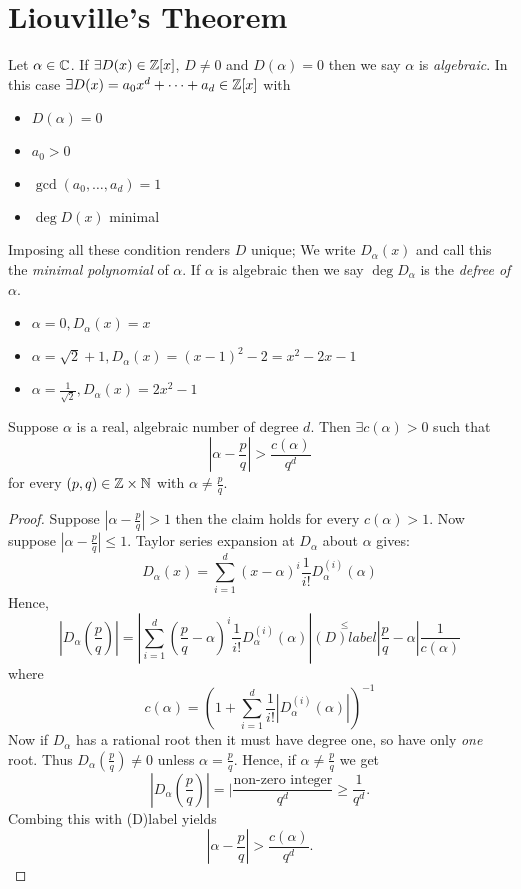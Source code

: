 \documentclass[NumTh.tex]{subfiles}
\begin{document}
\section{Liouville's Theorem}
Let $\alpha \in \mathbb{C}$. If $\exists D(x) \in \mathbb{Z}[x]$, $D \neq 0$ and $D(\alpha) = 0$ then we say $\alpha$ is \emph{algebraic}.
In this case $\exists D(x) = a_0 x^d + \dots + a_d \in \mathbb{Z}[x]$ with
\begin{itemize}
  \item $D(\alpha) = 0$
  \item $a_0 > 0$
  \item $\gcd(a_0,\dots,a_d) = 1$
  \item $\deg D(x)$ minimal
\end{itemize}
Imposing all these condition renders $D$ unique; We write $D_\alpha(x)$ and call this the \emph{minimal polynomial} of $\alpha$.
If $\alpha$ is algebraic then we say $\deg D_\alpha$ is the \emph{defree of $\alpha$}.

\begin{ex}
  \begin{itemize}
    \item $\alpha = 0, D_\alpha(x) = x$
    \item $\alpha = \sqrt{2} + 1, D_\alpha(x) = (x -1)^2 - 2 = x^2 -2x -1$
    \item $\alpha = \frac {1}{\sqrt{2}}, D_\alpha(x) = 2x^2 -1$
  \end{itemize}
\end{ex}

\begin{theorem}
  Suppose $\alpha$ is a real, algebraic number of degree $d$.
  Then $\exists c(\alpha) > 0$ such that
  \[ |\alpha - \frac{p}{q}| > \frac{c(\alpha)}{q^d} \]
  for every $(p,q) \in \mathbb{Z} \times \mathbb{N}$ with $\alpha \neq \frac{p}{q}$.
\end{theorem}

\begin{proof}
  Suppose $|\alpha - \frac{p}{q} | > 1$ then the claim holds for every $c(\alpha) > 1$.
  Now suppose $|\alpha - \frac{p}{q}| \leq 1$. Taylor series expansion at $D_\alpha$ about $\alpha$ gives:
  \[ D_\alpha(x) = \sum_{i=1}^d (x - \alpha)^i \frac{1}{i!} D_\alpha^{(i)}(\alpha) \]
  Hence, 
  \[ |D_\alpha\left(\frac{p}{q}\right) | = | \sum_{i=1}^d \left(\frac{p}{q} - \alpha \right)^i \frac{1}{i!} D_\alpha^{(i)}(\alpha)| \overset{\leq}{(D)label} |\frac{p}{q} - \alpha | \frac{1}{c(\alpha)} \]
  where
  \[ c(\alpha) = \left( 1 + \sum_{i=1}^d \frac{1}{i!} |D_\alpha^{(i)}(\alpha) |\right)^{-1} \]
  Now if $D_\alpha$ has a rational root then it must have degree one, so have only \emph{one} root.
  Thus $D_\alpha \left(\frac{p}{q}\right) \neq 0$ unless $\alpha = \frac{p}{q}$.
  Hence, if $\alpha \neq \frac{p}{q}$ we get
  \[ | D_\alpha \left(\frac{p}{q}\right) | = | \frac{\text{non-zero integer}}{q^d} \geq \frac{1}{q^d}. \]
  Combing this with (D)label yields 
  \[ |\alpha - \frac{p}{q} | > \frac{c(\alpha)}{q^d}.\]
\end{proof}
\end{document}
